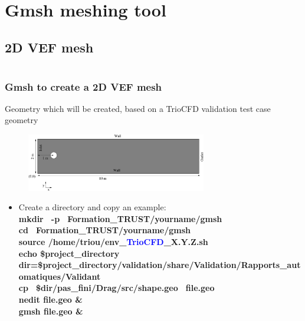 \documentclass[10pt, hyperref={unicode=true,pdfusetitle, bookmarks=true,bookmarksnumbered=false,bookmarksopen=false, breaklinks=false,pdfborder={0 0 1},backref=true,colorlinks=true,linkcolor=darkblue,pageanchor}]{beamer}
\begin{document}
\section{{\bf{Gmsh meshing tool}}} \label{gmsh}
\subsection{2D VEF mesh}
\begin{frame}
\begin{columns}[c] 
\tableofcontents[sections={1-9},currentsection, currentsubsection]
\tableofcontents[sections={10-16},currentsection, currentsubsection]
\end{columns}
\end{frame}
\begin{frame}
\frametitle{Gmsh to create a 2D VEF mesh}
\begin{block}{Geometry which will be created, based on a TrioCFD validation test case geometry}

\begin{figure}
\includegraphics[width=0.7\textwidth]{PICTURES/gmsh.pdf}
\end{figure}

\begin{itemize}
\item Create a directory and copy an example:\\
{\footnotesize{
\textbf{mkdir \, -p \, Formation\_TRUST/yourname/gmsh} \\
\textbf{cd \, Formation\_TRUST/yourname/gmsh} \\
\textbf{source /home/triou/env\_\textcolor{blue}{TrioCFD}\_X.Y.Z.sh }\\
\textbf{echo \$project\_directory} \\
\textbf{dir=\$project\_directory/validation/share/Validation/Rapports\_automatiques/Validant} \\
\textbf{cp \, \$dir/pas\_fini/Drag/src/shape.geo \, file.geo} \\
\textbf{nedit file.geo \& } \\
\textbf{gmsh file.geo \&} }}\\
\end{itemize}

\end{block}
\end{frame}
\end{document}
